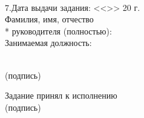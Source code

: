 \noindent \underline{\hspace{\textwidth}}
\noindent \underline{\hspace{\textwidth}}
\noindent \underline{\hspace{\textwidth}}
\noindent \underline{\hspace{\textwidth}}\\

\noindent 7.Дата выдачи задания: <<\underline{\hspace{1cm}}>>\underline{\hspace{3.5cm}} 20\underline{\hspace{0.8cm}} г.\\

\noindent Фамилия, имя, отчество\\*
руководителя (полностью):~\uline{\hfill}\\
\noindent Занимаемая должность:~\uline{\hfill}
\begin{flushright}
  \underline{\hspace{5cm}}\\
  \small
  (подпись)\hspace*{1.5cm}
  \normalsize
\end{flushright}


\noindent Задание принял к исполнению~\uline{\hfill}\\
\hspace*{11.5cm}
\small
(подпись)
\normalsize

\restoregeometry